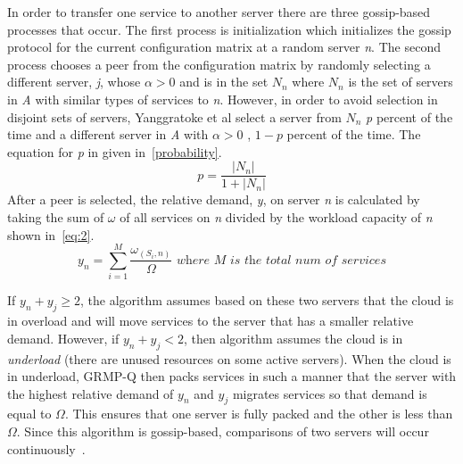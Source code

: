 \documentclass{sig-alternate}
\begin{document}
In order to transfer one service to another server there are three gossip-based processes that occur. The first process is initialization which initializes the gossip protocol for the current configuration matrix at a random server \emph{n}.  The second process chooses a peer from the configuration matrix by randomly selecting a different server, \emph{j}, whose $\alpha > 0$ and is in the set $N_{n}$ where $N_{n}$ is the set of servers in \emph{A} with similar types of services to \emph{n}. However, in order to avoid selection in disjoint sets of servers, Yanggratoke et al select a server from $N_{n}$ \emph{p} percent of the time and a different server in \emph{A} with $\alpha > 0$ , $1-p$ percent of the time. The equation for \emph{p} in given in~\eqref{probability}.
\begin{equation}
p = \frac{|N_{n}|}{1+|N_{n}|}\label{probability}
\end{equation}
After a peer is selected, the relative demand, \emph{y}, on server \emph{n} is calculated by taking the sum of \emph{$\omega$} of all services on \emph{n} divided by the workload capacity of \emph{n} shown in~\eqref{eq:2}.
\begin{equation}
y_n = \sum_{i=1}^M \frac{\omega_{(S_i,n)}}{\Omega} \textit{~where M is the total num of services}\label{eq:2}
\end{equation}

If $y_n + y_j \geq 2$, the algorithm assumes based on these two servers that the cloud is in overload and will move services to the server that has a smaller relative demand. However, if $y_n + y_j < 2$, then algorithm assumes the cloud is in \emph{underload} (there are unused resources on some active servers). When the cloud is in underload, GRMP-Q then packs services in such a manner that the server with the highest relative demand of $y_n$ and $y_j$ migrates services so that demand is equal to $\Omega$. This ensures that one server is fully packed and the other is less than $\Omega$. Since this algorithm is gossip-based,  comparisons of two servers will occur continuously~\cite{Yanggratoke}.  

\end{document}
